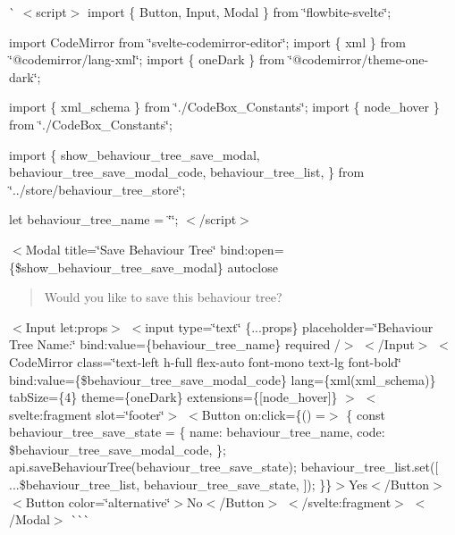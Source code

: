 \`{} $<$script$>$ import \{ Button, Input, Modal \} from \char`\"{}flowbite-\/svelte\char`\"{};

import Code\+Mirror from \char`\"{}svelte-\/codemirror-\/editor\char`\"{}; import \{ xml \} from \char`\"{}@codemirror/lang-\/xml\char`\"{}; import \{ one\+Dark \} from \char`\"{}@codemirror/theme-\/one-\/dark\char`\"{};

import \{ xml\+\_\+schema \} from \char`\"{}./\+Code\+Box\+\_\+\+Constants\char`\"{}; import \{ node\+\_\+hover \} from \char`\"{}./\+Code\+Box\+\_\+\+Constants\char`\"{};

import \{ show\+\_\+behaviour\+\_\+tree\+\_\+save\+\_\+modal, behaviour\+\_\+tree\+\_\+save\+\_\+modal\+\_\+code, behaviour\+\_\+tree\+\_\+list, \} from \char`\"{}../store/behaviour\+\_\+tree\+\_\+store\char`\"{};

let behaviour\+\_\+tree\+\_\+name = \char`\"{}\char`\"{}; $<$/script$>$

\texorpdfstring{$<$}{<}Modal title=\char`\"{}\+Save Behaviour Tree\char`\"{} bind\+:open=\{\$show\+\_\+behaviour\+\_\+tree\+\_\+save\+\_\+modal\} autoclose \begin{quote}
 

Would you like to save this behaviour tree? 

\end{quote}
$<$\+Input let\+:props$>$ \texorpdfstring{$<$}{<}input type=\char`\"{}text\char`\"{} \{...props\} placeholder=\char`\"{}\+Behaviour Tree Name\+:\char`\"{} bind\+:value=\{behaviour\+\_\+tree\+\_\+name\} required /\texorpdfstring{$>$}{>} $<$/\+Input$>$ $<$\+Code\+Mirror         class=\char`\"{}text-\/left h-\/full flex-\/auto font-\/mono text-\/lg font-\/bold\char`\"{}         bind\+:value=\{\$behaviour\+\_\+tree\+\_\+save\+\_\+modal\+\_\+code\}         lang=\{xml(xml\+\_\+schema)\}         tab\+Size=\{4\}         theme=\{one\+Dark\}         extensions=\{\mbox{[}node\+\_\+hover\mbox{]}\}     $>$ \texorpdfstring{$<$}{<}svelte\+:fragment slot=\char`\"{}footer\char`\"{}\texorpdfstring{$>$}{>} \texorpdfstring{$<$}{<}Button on\+:click=\{() =\texorpdfstring{$>$}{>} \{ const behaviour\+\_\+tree\+\_\+save\+\_\+state = \{ name\+: behaviour\+\_\+tree\+\_\+name, code\+: \$behaviour\+\_\+tree\+\_\+save\+\_\+modal\+\_\+code, \}; api.\+save\+Behaviour\+Tree(behaviour\+\_\+tree\+\_\+save\+\_\+state); behaviour\+\_\+tree\+\_\+list.\+set(\mbox{[} ...\$behaviour\+\_\+tree\+\_\+list, behaviour\+\_\+tree\+\_\+save\+\_\+state, \mbox{]}); \}\}\texorpdfstring{$>$}{>}Yes$<$/\+Button$>$ $<$\+Button color=\char`\"{}alternative\char`\"{}$>$No$<$/\+Button$>$ \texorpdfstring{$<$}{<}/svelte\+:fragment\texorpdfstring{$>$}{>} $<$/\+Modal$>$ \`{}\`{}\`{} 